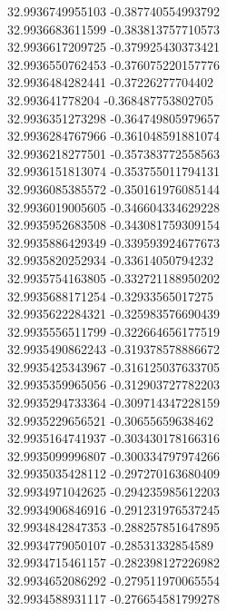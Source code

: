 {32.9936749955103	-0.387740554993792\\
32.9936683611599	-0.383813757710573\\
32.9936617209725	-0.379925430373421\\
32.9936550762453	-0.376075220157776\\
32.9936484282441	-0.37226277704402\\
32.993641778204	-0.368487753802705\\
32.9936351273298	-0.364749805979657\\
32.9936284767966	-0.361048591881074\\
32.9936218277501	-0.357383772558563\\
32.9936151813074	-0.353755011794131\\
32.9936085385572	-0.350161976085144\\
32.9936019005605	-0.346604334629228\\
32.9935952683508	-0.343081759309154\\
32.9935886429349	-0.339593924677673\\
32.9935820252934	-0.33614050794232\\
32.9935754163805	-0.332721188950202\\
32.9935688171254	-0.32933565017275\\
32.9935622284321	-0.325983576690439\\
32.9935556511799	-0.322664656177519\\
32.9935490862243	-0.319378578886672\\
32.9935425343967	-0.316125037633705\\
32.9935359965056	-0.312903727782203\\
32.9935294733364	-0.309714347228159\\
32.9935229656521	-0.30655659638462\\
32.9935164741937	-0.303430178166316\\
32.9935099996807	-0.300334797974266\\
32.9935035428112	-0.297270163680409\\
32.9934971042625	-0.294235985612203\\
32.9934906846916	-0.291231976537245\\
32.9934842847353	-0.288257851647895\\
32.9934779050107	-0.28531332854589\\
32.9934715461157	-0.282398127226982\\
32.9934652086292	-0.279511970065554\\
32.9934588931117	-0.276654581799278\\
}

